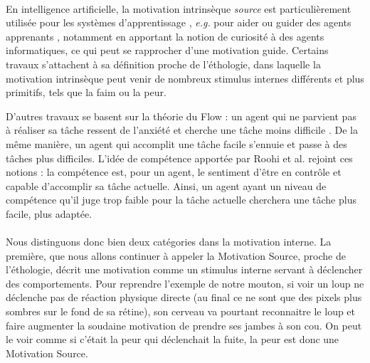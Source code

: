         
        \paragraph{}
        En intelligence artificielle, la motivation intrinsèque \textit{source} est particulièrement utilisée pour les systèmes d'apprentissage \cite{schmidhuber_formal_2010}, \textit{e.g.} pour aider ou guider des agents apprenants \cite{baldassarre_intrinsically_2013}, notamment en apportant la notion de curiosité à des agents informatiques, ce qui peut se rapprocher d'une motivation guide. Certains travaux  \cite{drogoul_multi-agent_1992, maes_agent_1991} s'attachent à sa définition proche de l'éthologie, dans laquelle la motivation intrinsèque peut venir de nombreux stimulus internes différents et plus primitifs, tels que la faim ou la peur.
        
        D'autres travaux se basent sur la théorie du Flow : un agent qui ne parvient pas à réaliser sa tâche ressent de l'anxiété et cherche une tâche moins difficile \cite{cornudella_how_2015}. De la même manière, un agent qui accomplit une tâche facile s'ennuie et passe à des tâches plus difficiles. L'idée de compétence apportée par Roohi et al. \cite{roohi_review_2018} rejoint ces notions : la compétence est, pour un agent, le sentiment d'être en contrôle et capable d'accomplir sa tâche actuelle. Ainsi, un agent ayant un niveau de compétence qu'il juge trop faible pour la tâche actuelle cherchera une tâche plus facile, plus adaptée.
        
        \paragraph{}
        Nous distinguons donc bien deux catégories dans la motivation interne. La première, que nous allons continuer à appeler la Motivation Source, proche de l'éthologie, décrit une motivation comme un stimulus interne servant à déclencher des comportements. Pour reprendre l'exemple de notre mouton, si voir un loup ne déclenche pas de réaction physique directe (au final ce ne sont que des pixels plus sombres sur le fond de sa rétine), son cerveau va pourtant reconnaitre le loup et faire augmenter la soudaine motivation de prendre ses jambes à son cou. On peut le voir comme si c'était la peur qui déclenchait la fuite, la peur est donc une Motivation Source.
        
